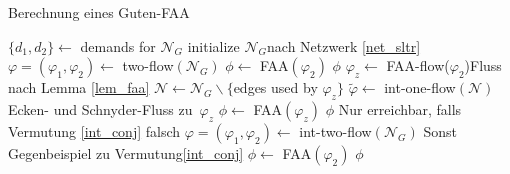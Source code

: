 \begin{algorithm}
\caption{Berechnung eines Guten-FAA}
\label{algo_gfaa}
\begin{algorithmic}[1]
	\State $\{d_1,d_2\} \gets $ demands for $\mathcal{N}_G$
	\State initialize $\mathcal{N}_G$\Comment nach Netzwerk \ref{net_sltr}
	\State $\varphi=(\varphi_1,\varphi_2) \gets $ two-flow$(\mathcal{N}_G)$\label{two_flow1}
			\State $\phi \gets $ FAA$(\varphi_2)$
			\State \Return $\phi$
		\Else
			\State $\varphi_z \gets$ FAA-flow($\varphi_2$)\Comment Fluss nach Lemma \ref{lem_faa}
			\State $\mathcal{N} \gets \mathcal{N}_G \backslash \{$edges used by $\varphi_z\}$\label{algo_check}
			\State $\tilde{\varphi} \gets $ int-one-flow$(\mathcal{N})$\Comment Ecken- und Schnyder-Fluss zu $\varphi_z$\label{int_one_flow1}
				\State $\phi \gets $ FAA$(\varphi_z)$
				\State \Return $\phi$
			\Else \Comment Nur erreichbar, falls Vermutung \ref{int_conj} falsch\label{sanity_check}
				\State $\varphi=(\varphi_1,\varphi_2) \gets $ int-two-flow$(\mathcal{N}_G)$
				\Comment Sonst Gegenbeispiel zu Vermutung\ref{int_conj}\label{int_two_flow1}
					\State $\phi \gets $ FAA$(\varphi_2)$
					\State \Return $\phi$
				\EndIf
			\EndIf
		\EndIf
	\EndIf
\EndIf
\EndProcedure
\end{algorithmic}
\end{algorithm}
